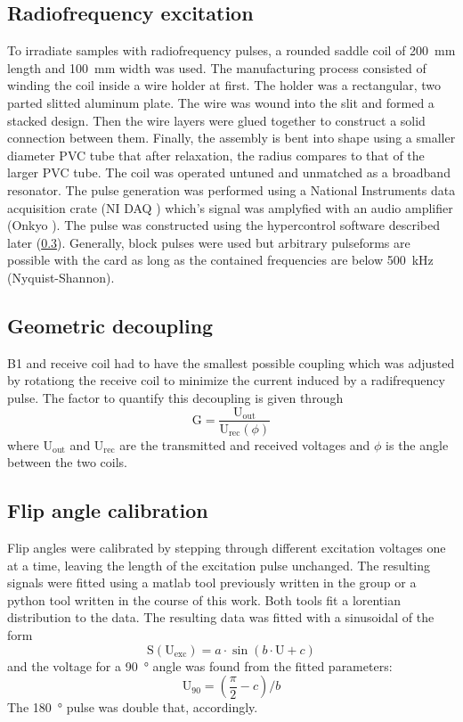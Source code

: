         \subsection{Radiofrequency excitation}
            To irradiate samples with radiofrequency pulses, a rounded saddle coil of \SI{200}{\mm} length and \SI{100}{\mm} width was used. The manufacturing process consisted of winding the coil inside a wire holder at first. The holder was a rectangular, two parted slitted aluminum plate. The wire was wound into the slit and formed a stacked design. Then the wire layers were glued together to construct a solid connection between them.  Finally, the assembly is bent into shape using a smaller diameter PVC tube that after relaxation, the radius compares to that of the larger PVC tube. The coil was operated untuned and unmatched as a broadband resonator. The pulse generation was performed using a National Instruments data acquisition crate (NI DAQ ) which's signal was amplyfied with an audio amplifier (Onkyo ).
            The pulse was constructed using the hypercontrol software described later (\ref{}). Generally, block pulses were used but arbitrary pulseforms are possible with the card as long as the contained frequencies are below \SI{500}{\kilo\hertz} (Nyquist-Shannon). 
        \subsection{Geometric decoupling}
            B1 and receive coil had to have the smallest possible coupling which was adjusted by rotationg the receive coil to minimize the current induced by a radifrequency pulse. The factor to quantify this decoupling is given through 
            \begin{equation}
            \mathrm{G}=\frac{\mathrm{U_{out}}}{\mathrm{U_{rec}}(\phi)}
            \end{equation}
            where $\mathrm{U_{out}}$ and $\mathrm{U_{rec}}$ are the transmitted and received voltages and $\phi$ is the angle between the two coils.
        \subsection{Flip angle calibration}
            Flip angles were calibrated by stepping through different excitation voltages one at a time, leaving the length of the excitation pulse unchanged. The resulting signals were fitted using a matlab tool previously written in the group or a python tool written in the course of this work. Both tools fit a lorentian distribution to the data.
            The resulting data was fitted with a sinusoidal of the form
            \begin{equation}
                \mathrm{S}(\mathrm{U_{exc}})= a \cdot \sin(b\cdot \mathrm{U} + c)
            \end{equation}
            and the voltage for a  \SI{90}{\degree} angle was found from the fitted parameters:
            \begin{equation}
                \mathrm{U}_{90} = (\frac{\pi}{2}-c)/b
            \end{equation}
            The \SI{180}{\degree} pulse was double that, accordingly.
